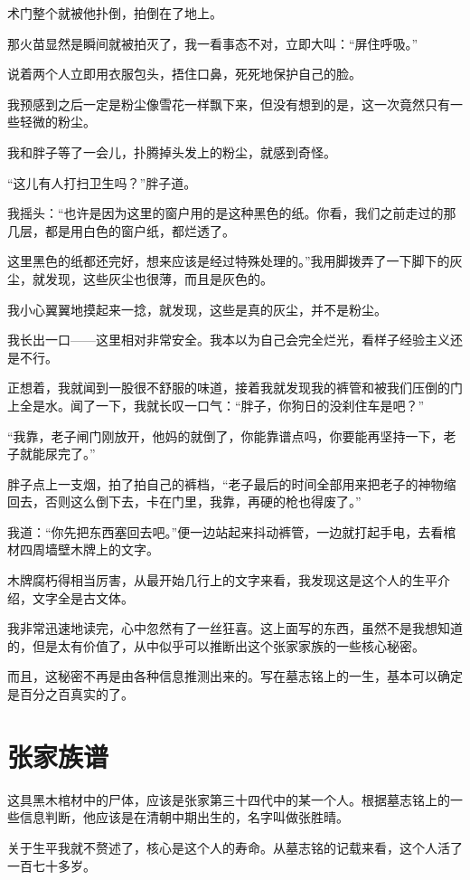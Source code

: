 术门整个就被他扑倒，拍倒在了地上。

那火苗显然是瞬间就被拍灭了，我一看事态不对，立即大叫：“屏住呼吸。”

说着两个人立即用衣服包头，捂住口鼻，死死地保护自己的脸。

我预感到之后一定是粉尘像雪花一样飘下来，但没有想到的是，这一次竟然只有一些轻微的粉尘。

我和胖子等了一会儿，扑腾掉头发上的粉尘，就感到奇怪。

“这儿有人打扫卫生吗？”胖子道。

我摇头：“也许是因为这里的窗户用的是这种黑色的纸。你看，我们之前走过的那几层，都是用白色的窗户纸，都烂透了。

这里黑色的纸都还完好，想来应该是经过特殊处理的。”我用脚拨弄了一下脚下的灰尘，就发现，这些灰尘也很薄，而且是灰色的。

我小心翼翼地摸起来一捻，就发现，这些是真的灰尘，并不是粉尘。

我长出一口——这里相对非常安全。我本以为自己会完全烂光，看样子经验主义还是不行。

正想着，我就闻到一股很不舒服的味道，接着我就发现我的裤管和被我们压倒的门上全是水。闻了一下，我就长叹一口气：“胖子，你狗日的没刹住车是吧？”

“我靠，老子闸门刚放开，他妈的就倒了，你能靠谱点吗，你要能再坚持一下，老子就能尿完了。”

胖子点上一支烟，拍了拍自己的裤档，“老子最后的时间全部用来把老子的神物缩回去，否则这么倒下去，卡在门里，我靠，再硬的枪也得废了。”

我道：“你先把东西塞回去吧。”便一边站起来抖动裤管，一边就打起手电，去看棺材四周墙壁木牌上的文字。

木牌腐朽得相当厉害，从最开始几行上的文字来看，我发现这是这个人的生平介绍，文字全是古文体。

我非常迅速地读完，心中忽然有了一丝狂喜。这上面写的东西，虽然不是我想知道的，但是太有价值了，从中似乎可以推断出这个张家家族的一些核心秘密。

而且，这秘密不再是由各种信息推测出来的。写在墓志铭上的一生，基本可以确定是百分之百真实的了。

\chapter{张家族谱}

这具黑木棺材中的尸体，应该是张家第三十四代中的某一个人。根据墓志铭上的一些信息判断，他应该是在清朝中期出生的，名字叫做张胜晴。

关于生平我就不赘述了，核心是这个人的寿命。从墓志铭的记载来看，这个人活了一百七十多岁。

